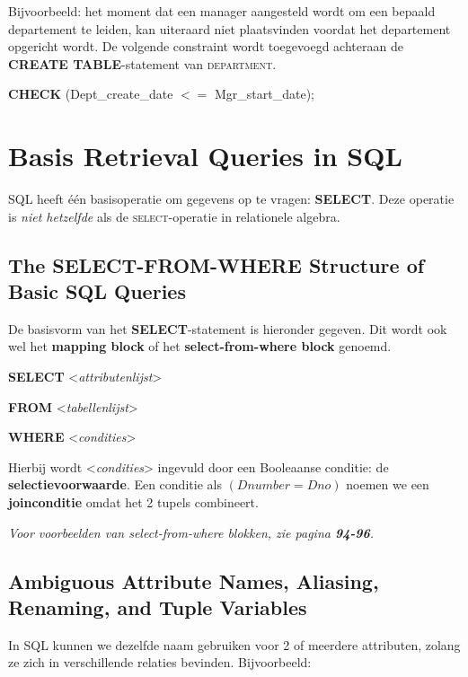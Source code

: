 Bijvoorbeeld: het moment dat een manager aangesteld wordt om een bepaald departement te leiden, kan uiteraard niet plaatsvinden voordat het departement opgericht wordt. De volgende constraint wordt toegevoegd achteraan de \textbf{CREATE TABLE}-statement van \textsc{department}.

\vspace{1mm}\hspace{10mm}
\textbf{CHECK} (Dept\_create\_date $<=$ Mgr\_start\_date);



\newpage
\section{Basis Retrieval Queries in SQL}
SQL heeft \'e\'en basisoperatie om gegevens op te vragen: \textbf{SELECT}. Deze operatie is \textit{niet hetzelfde} als de \textsc{select}-operatie in relationele algebra.


\subsection{The SELECT-FROM-WHERE Structure of Basic SQL Queries}
De basisvorm van het \textbf{SELECT}-statement is hieronder gegeven. Dit wordt ook wel het \textbf{mapping block} of het \textbf{select-from-where block} genoemd.

\vspace{1mm}\hspace{10mm}
\textbf{SELECT} {\textless}\textit{attributenlijst}{\textgreater}

\hspace{10mm}
\textbf{FROM} {\textless}\textit{tabellenlijst}{\textgreater}

\hspace{10mm}
\textbf{WHERE} {\textless}\textit{condities}{\textgreater}
\vspace{3mm}

\noindent Hierbij wordt {\textless}\textit{condities}{\textgreater} ingevuld door een Booleaanse conditie: de \textbf{selectievoorwaarde}. Een conditie als $(\textit{Dnumber} = \textit{Dno})$ noemen we een \textbf{joinconditie} omdat het 2 tupels combineert.

\textit{Voor voorbeelden van select-from-where blokken, zie pagina \textbf{94-96}.}


\subsection{Ambiguous Attribute Names, Aliasing, Renaming, and Tuple Variables}
In SQL kunnen we dezelfde naam gebruiken voor 2 of meerdere attributen, zolang ze zich in verschillende relaties bevinden. Bijvoorbeeld:

